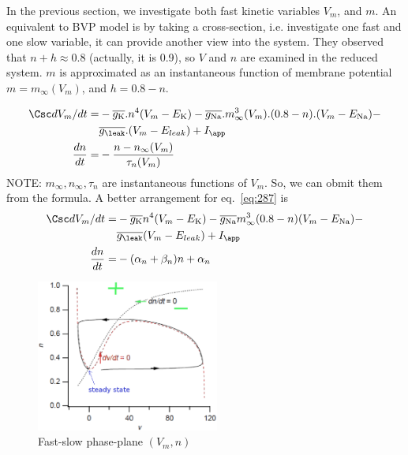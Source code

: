 In the previous
section, we investigate both fast kinetic variables $V_m$, and $m$. An
equivalent to BVP model is by taking a cross-section, i.e. investigate one fast
and one slow variable, it can provide another view into the system. They
observed that $n+h \approx 0.8$ (actually, it is 0.9), so $V$ and $n$ are examined in the
reduced system. $m$ is approximated as an instantaneous function of membrane
potential $m=m_\infty(V_m)$, and $h=0.8-n$.

\begin{equation}
  \label{eq:287}
  \begin{split}
    \Csc dV_m /dt =& - \overline{g_{\ce{K}}}.n^4(V_m -E_{\ce{K}}) - \overline{g_{\ce{Na}}}.
    m_\infty^3(V_m).(0.8-n).(V_m -E_{\ce{Na}}) - \\
    & \overline{g_{\leak}}.(V_m -E_{leak}) + I_\app\\
    \frac{dn}{dt} =& -\frac{n-n_\infty(V_m)}{\tau_n(V_m)}
  \end{split}
\end{equation}
NOTE: $m_\infty, n_\infty, \tau_n$ are instantaneous functions of $V_m$. So, we
can obmit them from the formula. A better arrangement for eq.~\eqref{eq:287} is
\begin{equation}
  \label{eq:604}
  \begin{split}
    \Csc dV_m /dt =& - \overline{g_{\ce{K}}}n^4(V_m -E_{\ce{K}}) -
     \overline{g_{\ce{Na}}} m_\infty^3(0.8-n)(V_m -E_{\ce{Na}}) - \\
	&     \overline{g_{\leak}} (V_m -E_{leak}) + I_\app\\
    \frac{dn}{dt} =& -(\alpha_n+\beta_n)n +\alpha_n
  \end{split}
\end{equation}


\begin{figure}[hbt]
  \centerline{\includegraphics[height=5cm,
    angle=0]{./images/FN_fast_slow.eps}}
  \caption{Fast-slow phase-plane $(V_m,n)$}
  \label{fig:FN_fast_slow}
\end{figure}

